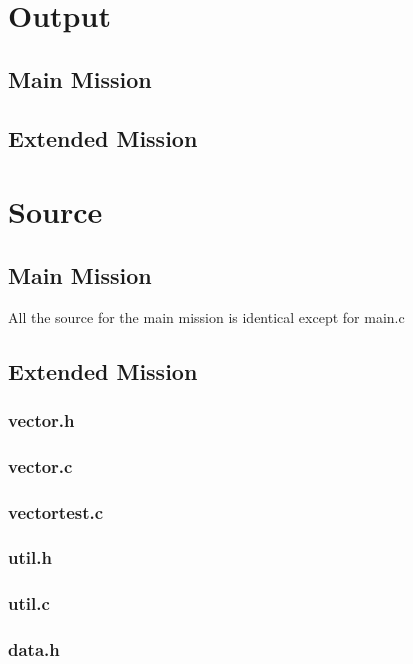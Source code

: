 \documentclass[a4paper, twoside]{article}
\begin{document}
\newpage
\section{Output}
\subsection{Main Mission}


\newpage
\subsection{Extended Mission}


\newpage
\section{Source}
\subsection{Main Mission}
All the source for the main mission is identical except for main.c


\newpage
\subsection{Extended Mission}
\subsubsection{vector.h}

\subsubsection{vector.c}

\subsubsection{vectortest.c}

\subsubsection{util.h}

\subsubsection{util.c}

\subsubsection{data.h}

\end{document}
